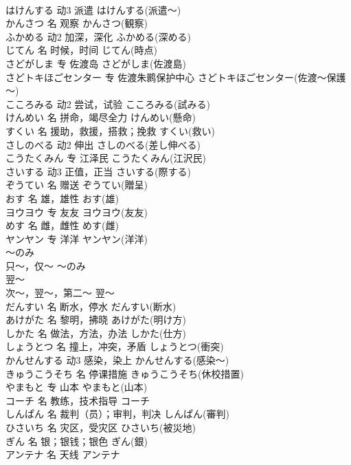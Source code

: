 \documentclass[8pt]{extreport}
\begin{document}
\begin{CJK}{UTF8}{min}
\\	はけんする	动3	派遣	はけんする(派遣～)	
\\	かんさつ	名	观察	かんさつ(観察)	
\\	ふかめる	动2	加深，深化	ふかめる(深める)	
\\	じてん	名	时候，时间	じてん(時点)	
\\	さどがしま	专	佐渡岛	さどがしま(佐渡島)	
\\	さどトキほごセンター	专	佐渡朱鹮保护中心	さどトキほごセンター(佐渡～保護～)	
\\	こころみる	动2	尝试，试验	こころみる(試みる)	
\\	けんめい	名	拼命，竭尽全力	けんめい(懸命)	
\\	すくい	名	援助，救援，搭救；挽救	すくい(救い)	
\\	さしのべる	动2	伸出	さしのべる(差し伸べる)	
\\	こうたくみん	专	江泽民	こうたくみん(江沢民)	
\\	さいする	动3	正值，正当	さいする(際する)	
\\	ぞうてい	名	赠送	ぞうてい(贈呈)	
\\	おす	名	雄，雄性	おす(雄)	
\\	ヨウヨウ	专	友友	ヨウヨウ(友友)	
\\	めす	名	雌，雌性	めす(雌)	
\\	ヤンヤン	专	洋洋	ヤンヤン(洋洋)	
\\	～のみ	
\\	只～，仅～	～のみ	
\\	翌～	
\\	次～，翌～，第二～	翌～	
\\	だんすい	名	断水，停水	だんすい(断水)	
\\	あけがた	名	黎明，拂晓	あけがた(明け方)	
\\	しかた	名	做法，方法，办法	しかた(仕方)	
\\	しょうとつ	名	撞上，冲突，矛盾	しょうとつ(衝突)	
\\	かんせんする	动3	感染，染上	かんせんする(感染～)	
\\	きゅうこうそち	名	停课措施	きゅうこうそち(休校措置)	
\\	やまもと	专	山本	やまもと(山本)	
\\	コーチ	名	教练，技术指导	コーチ	
\\	しんぱん	名	裁判（员）；审判，判决	しんぱん(審判)	
\\	ひさいち	名	灾区，受灾区	ひさいち(被災地)	
\\	ぎん	名	银；银钱；银色	ぎん(銀)	
\\	アンテナ	名	天线	アンテナ	

\end{CJK}
\end{document}
